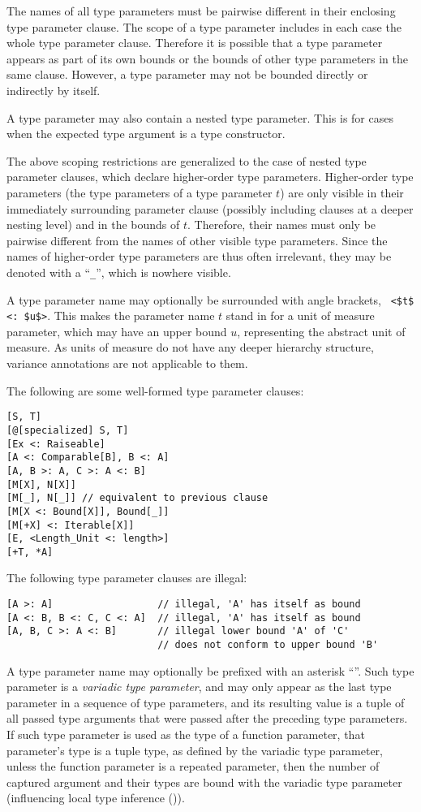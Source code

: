 The names of all type parameters must be pairwise different in their enclosing type parameter clause. The scope of a type parameter includes in each case the whole type parameter clause. Therefore it is possible that a type parameter appears as part of its own bounds or the bounds of other type parameters in the same clause. However, a type parameter may not be bounded directly or indirectly by itself. 

A type parameter may also contain a nested type parameter. This is for cases when the expected type argument is a type constructor. 

The above scoping restrictions are generalized to the case of nested type parameter clauses, which declare higher-order type parameters. Higher-order type parameters (the type parameters of a type parameter $t$) are only visible in their immediately surrounding parameter clause (possibly including clauses at a deeper nesting level) and in the bounds of $t$. Therefore, their names must only be pairwise different from the names of other visible type parameters. Since the names of higher-order type parameters are thus often irrelevant, they may be denoted with a ``\lstinline!_!'', which is nowhere visible. 

A type parameter name may optionally be surrounded with angle brackets, ~\lstinline!<$t$ <: $u$>!. This makes the parameter name $t$ stand in for a unit of measure parameter, which may have an upper bound $u$, representing the abstract unit of measure. As units of measure do not have any deeper hierarchy structure, variance annotations are not applicable to them. 

\example The following are some well-formed type parameter clauses:
\begin{lstlisting}
[S, T]
[@[specialized] S, T]
[Ex <: Raiseable]
[A <: Comparable[B], B <: A]
[A, B >: A, C >: A <: B]
[M[X], N[X]]
[M[_], N[_]] // equivalent to previous clause
[M[X <: Bound[X]], Bound[_]]
[M[+X] <: Iterable[X]]
[E, <Length_Unit <: length>]
[+T, *A]
\end{lstlisting}
The following type parameter clauses are illegal:
\begin{lstlisting}
[A >: A]                  // illegal, 'A' has itself as bound
[A <: B, B <: C, C <: A]  // illegal, 'A' has itself as bound
[A, B, C >: A <: B]       // illegal lower bound 'A' of 'C'
                          // does not conform to upper bound 'B'
\end{lstlisting}

A type parameter name may optionally be prefixed with an asterisk ``\code{*}''. Such type parameter is a {\em variadic type parameter}, and may only appear as the last type parameter in a sequence of type parameters, and its resulting value is a tuple of all passed type arguments that were passed after the preceding type parameters. If such type parameter is used as the type of a function parameter, that parameter's type is a tuple type, as defined by the variadic type parameter, unless the function parameter is a repeated parameter, then the number of captured argument and their types are bound with the variadic type parameter (influencing local type inference ()). 

